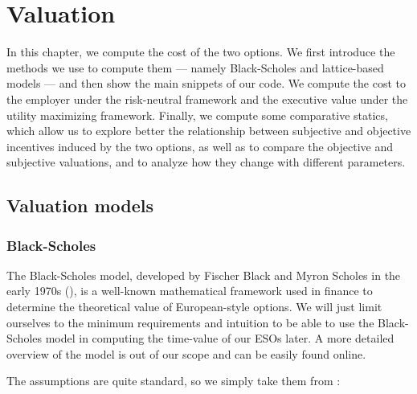 \section{Valuation}

    In this chapter, we compute the cost of the two options. We first introduce the methods we use to compute them --- namely Black-Scholes and lattice-based models --- and then show the main snippets of our code. We compute the cost to the employer under the risk-neutral framework and the executive value under the utility maximizing framework. Finally, we compute some comparative statics, which allow us to explore better the relationship between subjective and objective incentives induced by the two options, as well as to compare the objective and subjective valuations, and to analyze how they change with different parameters.






\subsection{Valuation models} 

\subsubsection*{Black-Scholes}
    The Black-Scholes model, developed by Fischer Black and Myron Scholes in the early 1970s (\cite{black1973pricing}), is a well-known mathematical framework used in finance to determine the theoretical value of European-style options. We will just limit ourselves to the minimum requirements and intuition to be able to use the Black-Scholes model in computing the time-value of our ESOs later. A more detailed overview of the model is out of our scope and can be easily found online. 
    
    The assumptions are quite standard, so we simply take them from \cite{wiki:blackscholes}:

